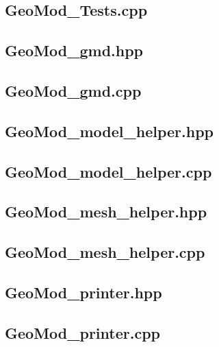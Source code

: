 \documentclass[a4paper, 12pt]{article}
\begin{document}
\subsection{GeoMod\_Tests.cpp} \label{subsec:Tests_cpp}


\subsection{GeoMod\_gmd.hpp} \label{subsec:gmd_hpp}

\subsection{GeoMod\_gmd.cpp} \label{subsec:gmd_cpp}


\subsection{GeoMod\_model\_helper.hpp} \label{subsec:model_hpp}

\subsection{GeoMod\_model\_helper.cpp} \label{subsec:model_cpp}


\subsection{GeoMod\_mesh\_helper.hpp} \label{subsec:mesh_hpp}

\subsection{GeoMod\_mesh\_helper.cpp} \label{subsec:mesh_cpp}


\subsection{GeoMod\_printer.hpp} \label{subsec:printer_hpp}

\subsection{GeoMod\_printer.cpp} \label{subsec:printer_cpp}

\end{document}
